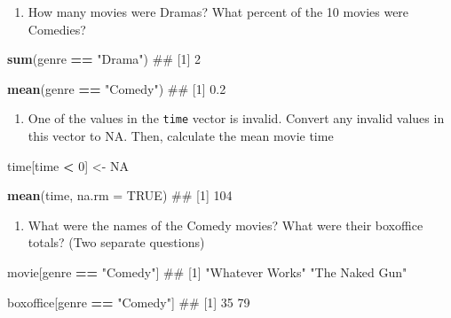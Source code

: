 \documentclass[]{book}
\newenvironment{Shaded}{\begin{snugshade}}{\end{snugshade}}
\newcommand{\KeywordTok}[1]{\textcolor[rgb]{0.13,0.29,0.53}{\textbf{#1}}}
\newcommand{\DataTypeTok}[1]{\textcolor[rgb]{0.13,0.29,0.53}{#1}}
\newcommand{\DecValTok}[1]{\textcolor[rgb]{0.00,0.00,0.81}{#1}}
\newcommand{\StringTok}[1]{\textcolor[rgb]{0.31,0.60,0.02}{#1}}
\newcommand{\OtherTok}[1]{\textcolor[rgb]{0.56,0.35,0.01}{#1}}
\newcommand{\OperatorTok}[1]{\textcolor[rgb]{0.81,0.36,0.00}{\textbf{#1}}}
\newcommand{\NormalTok}[1]{#1}
\providecommand{\tightlist}{%
  \setlength{\itemsep}{0pt}\setlength{\parskip}{0pt}}
\theoremstyle{definition}
\theoremstyle{definition}
\theoremstyle{remark}
\begin{document}
\begin{enumerate}
\def\labelenumi{\arabic{enumi}.}
\setcounter{enumi}{4}
\tightlist
\item
  How many movies were Dramas? What percent of the 10 movies were
  Comedies?
\end{enumerate}

\begin{Shaded}
\begin{Highlighting}[]
\KeywordTok{sum}\NormalTok{(genre }\OperatorTok{==}\StringTok{ "Drama"}\NormalTok{)}
\NormalTok{## [1] 2}

\KeywordTok{mean}\NormalTok{(genre }\OperatorTok{==}\StringTok{ "Comedy"}\NormalTok{)}
\NormalTok{## [1] 0.2}
\end{Highlighting}
\end{Shaded}

\begin{enumerate}
\def\labelenumi{\arabic{enumi}.}
\setcounter{enumi}{5}
\tightlist
\item
  One of the values in the \texttt{time} vector is invalid. Convert any
  invalid values in this vector to NA. Then, calculate the mean movie
  time
\end{enumerate}

\begin{Shaded}
\begin{Highlighting}[]
\NormalTok{time[time }\OperatorTok{<}\StringTok{ }\DecValTok{0}\NormalTok{] <-}\StringTok{ }\OtherTok{NA}

\KeywordTok{mean}\NormalTok{(time, }\DataTypeTok{na.rm =} \OtherTok{TRUE}\NormalTok{)}
\NormalTok{## [1] 104}
\end{Highlighting}
\end{Shaded}

\begin{enumerate}
\def\labelenumi{\arabic{enumi}.}
\setcounter{enumi}{6}
\tightlist
\item
  What were the names of the Comedy movies? What were their boxoffice
  totals? (Two separate questions)
\end{enumerate}

\begin{Shaded}
\begin{Highlighting}[]
\NormalTok{movie[genre }\OperatorTok{==}\StringTok{ "Comedy"}\NormalTok{]}
\NormalTok{## [1] "Whatever Works" "The Naked Gun"}

\NormalTok{boxoffice[genre }\OperatorTok{==}\StringTok{ "Comedy"}\NormalTok{]}
\NormalTok{## [1] 35 79}
\end{Highlighting}
\end{Shaded}
\end{document}
